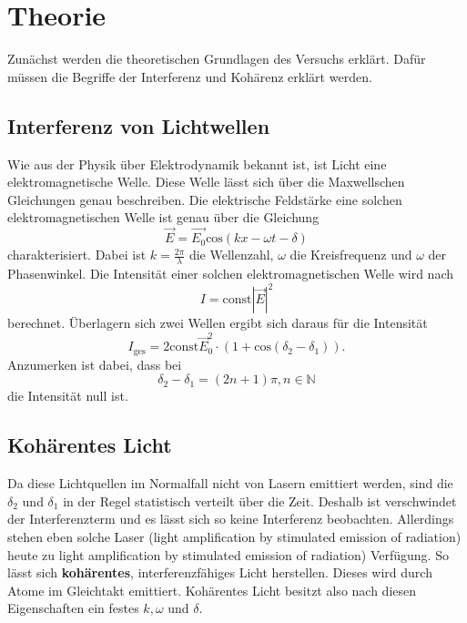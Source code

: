 \section{Theorie}
\label{sec:Theorie}

Zunächst werden die theoretischen Grundlagen des Versuchs erklärt.
Dafür müssen die Begriffe der Interferenz und Kohärenz erklärt werden.


\subsection{Interferenz von Lichtwellen}
Wie aus der Physik über Elektrodynamik bekannt ist, ist Licht eine elektromagnetische Welle.
Diese Welle lässt sich über die Maxwellschen Gleichungen genau beschreiben.
Die elektrische Feldstärke eine solchen elektromagnetischen Welle ist genau über die Gleichung
\begin{equation}
    \vec{E} = \vec{E_0} \text{cos}\left( kx - \omega t - \delta \right)
\end{equation} 
charakterisiert. Dabei ist $k = \frac{2 \pi}{\lambda}$ die Wellenzahl, $\omega$ die Kreisfrequenz und $\omega$ der Phasenwinkel.
Die Intensität einer solchen elektromagnetischen Welle wird nach
\begin{equation}
    I = \text{const} |\vec{E}|^2
\end{equation}
berechnet. Überlagern sich zwei Wellen ergibt sich daraus für die Intensität
\begin{equation}
    I_\text{ges} = 2 \text{const} \vec{E}^2_0 \cdot \left( 1 + \text{cos} \left( \delta_2 - \delta_1 \right) \right).
\end{equation}
Anzumerken ist dabei, dass bei 
\begin{equation*}
    \delta_2 - \delta_1 = (2n + 1) \pi, n \in \mathbb{N}
\end{equation*}
die Intensität null ist.


\subsection{Kohärentes Licht}
Da diese Lichtquellen im Normalfall nicht von Lasern emittiert werden, sind die
$\delta_2$ und $\delta_1$ in der Regel statistisch verteilt über die Zeit.
Deshalb ist verschwindet der Interferenzterm und es lässt sich so keine Interferenz beobachten.
Allerdings stehen eben solche Laser (light amplification by stimulated emission of radiation) heute zu light amplification by stimulated emission of radiation) Verfügung.
So lässt sich \textbf{kohärentes}, interferenzfähiges Licht herstellen.
Dieses wird durch Atome im Gleichtakt emittiert.
Kohärentes Licht besitzt also nach diesen Eigenschaften ein festes $k, \omega$ und $\delta$.

